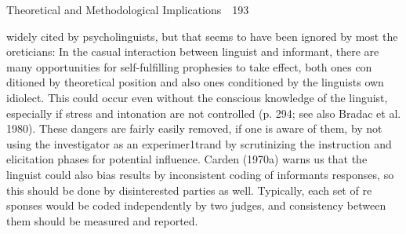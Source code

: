 \clearpage\setcounter{page}{1}\begin{styleStandard}
Theoretical and Methodological Implications\ \ 193
\end{styleStandard}


\begin{styleTextbody}
widely cited by psycholinguists, but that seems to have been ignored by most the\- oreticians: {\textquotedbl}In the casual interaction between linguist and informant, there are many opportunities for self-fulfilling prophesies to take effect, both ones con\- ditioned by theoretical position and also ones conditioned by the linguist{\textquotesingle}s own idiolect. This could occur even without the conscious knowledge of the linguist, especially if stress and intonation are not controlled{\textquotedbl} (p. 294; see also Bradac et al. 1980). These dangers are fairly easily removed, if one is aware of them, by not using the investigator as an experimer1trand by scrutinizing the instruction and elicitation phases for potential influence. Carden (1970a) warns us that the linguist could also bias results by inconsistent coding of informants{\textquotesingle} responses, so this should be done by disinterested parties as well. Typically, each set of re\- sponses would be coded independently by two judges, and consistency between them should be measured and reported.
\end{styleTextbody}


